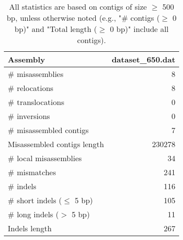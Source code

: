 \documentclass[12pt,a4paper]{article}
\begin{document}
\begin{table}[ht]
\begin{center}
\caption{All statistics are based on contigs of size $\geq$ 500 bp, unless otherwise noted (e.g., "\# contigs ($\geq$ 0 bp)" and "Total length ($\geq$ 0 bp)" include all contigs).}
\begin{tabular}{|l*{1}{|r}|}
\hline
Assembly & dataset\_650.dat \\ \hline
\# misassemblies & 8 \\ \hline
\hspace{5mm}\# relocations & 8 \\ \hline
\hspace{5mm}\# translocations & 0 \\ \hline
\hspace{5mm}\# inversions & 0 \\ \hline
\# misassembled contigs & 7 \\ \hline
Misassembled contigs length & 230278 \\ \hline
\# local misassemblies & 34 \\ \hline
\# mismatches & 241 \\ \hline
\# indels & 116 \\ \hline
\hspace{5mm}\# short indels ($\leq$ 5 bp) & 105 \\ \hline
\hspace{5mm}\# long indels ($>$ 5 bp) & 11 \\ \hline
Indels length & 267 \\ \hline
\end{tabular}
\end{center}
\end{table}
\end{document}
